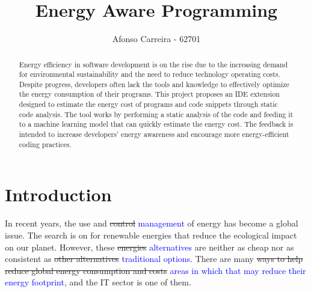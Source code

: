 \documentclass[sigplan]{acmart}
\newcommand{\wnote}[1]{\textcolor{blue}{#1}}
\begin{document}
\title{Energy Aware Programming}

\author{Afonso Carreira - 62701}


\begin{abstract}
  Energy efficiency in software development is on the rise due to the increasing demand for environmental sustainability and the need to reduce technology operating costs. Despite progress, developers often lack the tools and knowledge to effectively optimize the energy consumption of their programs. This project proposes an IDE extension designed to estimate the energy cost of programs and code snippets through static code analysis. The tool works by performing a static analysis of the code and feeding it to a machine learning model that can quickly estimate the energy cost. The feedback is intended to increase developers' energy awareness and encourage more energy-efficient coding practices.
\end{abstract}



\pagestyle{plain} %

\maketitle
\section{Introduction}

In recent years, the use and \st{control} \wnote{management} of energy has become a global issue. The search is on for renewable energies that reduce the ecological impact on our planet. However, these \st{energies} \wnote{alternatives} are neither as cheap nor as consistent as \st{other alternatives} \wnote{traditional options}. There are many \st{ways to help reduce global energy consumption and costs} \wnote{areas in which that may reduce their energy footprint}, and the IT sector is one of them.
\end{document}
